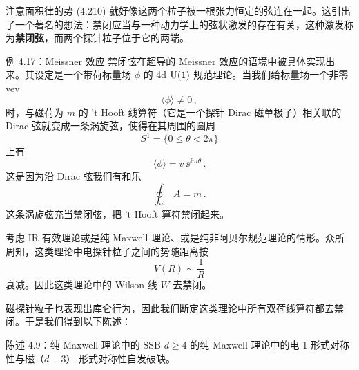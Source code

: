 
注意面积律的势 (4.210) 就好像这两个粒子被一根张力恒定的弦连在一起。这引出了一个著名的想法：禁闭应当与一种动力学上的弦状激发的存在有关，这种激发称为\textbf{禁闭弦}，而两个探针粒子位于它的两端。

\begin{examplebox}{例 4.17：Meissner 效应}
禁闭弦在超导的 Meissner 效应的语境中被具体实现出来。其设定是一个带荷标量场 $\phi$ 的 4d $\mathrm{U}(1)$ 规范理论。当我们给标量场一个非零 vev
\begin{equation}
  \langle\phi\rangle\neq 0\,, \tag{4.211}
\end{equation}
时，与磁荷为 $m$ 的 't Hooft 线算符（它是一个探针 Dirac 磁单极子）相关联的 Dirac 弦就变成一条涡旋弦，使得在其周围的圆周
\begin{equation}
  S^1=\{0\le\theta<2\pi\} \tag{4.212}
\end{equation}
上有
\begin{equation}
  \langle\phi\rangle=v\,\ee^{\ii m\theta}\,. \tag{4.213}
\end{equation}
这是因为沿 Dirac 弦我们有和乐
\begin{equation}
  \oint_{S^1}A=m\,. \tag{4.214}
\end{equation}
这条涡旋弦充当禁闭弦，把 't Hooft 算符禁闭起来。
\end{examplebox}



考虑 IR 有效理论或是纯 Maxwell 理论、或是纯非阿贝尔规范理论的情形。众所周知，这类理论中电探针粒子之间的势随距离按
\begin{equation}
  V(R)\sim\frac{1}{R} \tag{4.215}
\end{equation}
衰减。因此这类理论中的 Wilson 线 $W$ 去禁闭。

磁探针粒子也表现出库仑行为，因此我们断定这类理论中所有双荷线算符都去禁闭。于是我们得到以下陈述：

\begin{statementbox}{陈述 4.9：纯 Maxwell 理论中的 SSB}
$d\ge 4$ 的纯 Maxwell 理论中的电 1-形式对称性与磁（$d-3$）-形式对称性自发破缺。
\end{statementbox}


